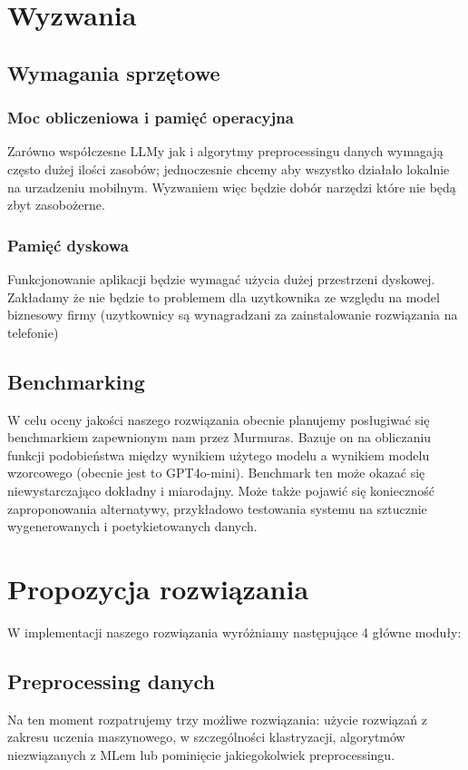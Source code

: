 \documentclass[12pt]{article}
\begin{document}
\section*{Wyzwania}

\subsection*{Wymagania sprzętowe}
\subsubsection*{Moc obliczeniowa i pamięć operacyjna}
Zarówno współczesne LLMy jak i algorytmy preprocessingu danych wymagają często dużej ilości zasobów; jednoczesnie chcemy aby wszystko działało lokalnie na urzadzeniu mobilnym. Wyzwaniem więc będzie dobór narzędzi które nie będą zbyt zasobożerne.

\subsubsection*{Pamięć dyskowa}
Funkcjonowanie aplikacji będzie wymagać użycia dużej przestrzeni dyskowej. Zakładamy że nie będzie to problemem dla uzytkownika ze względu na model biznesowy firmy (uzytkownicy są wynagradzani za zainstalowanie rozwiązania na telefonie)

\subsection*{Benchmarking}
W celu oceny jakości naszego rozwiązania obecnie planujemy posługiwać się benchmarkiem zapewnionym nam przez Murmuras. Bazuje on na obliczaniu funkcji podobieństwa między wynikiem użytego modelu a wynikiem modelu wzorcowego (obecnie jest to GPT4o-mini). Benchmark ten może okazać się niewystarczająco dokładny i miarodajny. Może także pojawić się konieczność zaproponowania alternatywy, przykładowo testowania systemu na sztucznie wygenerowanych i poetykietowanych danych.

\section*{Propozycja rozwiązania}
W implementacji naszego rozwiązania wyróżniamy następujące 4 główne moduły: \\
\subsection*{Preprocessing danych}
Na ten moment rozpatrujemy trzy możliwe rozwiązania: użycie rozwiązań z zakresu uczenia maszynowego, w szczególności klastryzacji, algorytmów niezwiązanych z MLem lub pominięcie jakiegokolwiek preprocessingu. \\
\end{document}

